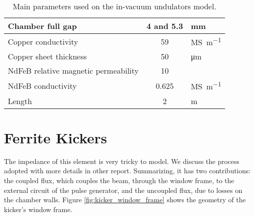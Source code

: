 \begin{table}[!t]
 \centering
 \caption{Main parameters used on the in-vacuum undulators model.}
 \label{tab:invac_undulators}
 \begin{tabular}{lcl}\hline
  Chamber full gap      & 4 and 5.3            & \si{\milli\meter} \\\hline
  Copper conductivity\cite{matwebsite} & 59& \si{\mega\siemens\per\meter} \\\hline
  Copper sheet thickness &     50          & \si{\micro\meter} \\\hline
  NdFeB relative magnetic permeability & 10    & \\\hline
  NdFeB conductivity\cite{matwebsite} & 0.625& \si{\mega\siemens\per\meter}\\\hline
  Length                & 2                & \si{\meter}   \\\hline
 \end{tabular}
\end{table}



\section{Ferrite Kickers}

The impedance of this element is very tricky to model. We discuss the process adopted with more details in other report. Summarizing, it has two contributions: the coupled flux, which couples the beam, through the window frame, to the external circuit of the pulse generator, and the uncoupled flux, due to losses on the chamber walls. Figure \ref{fig:kicker_window_frame} shows the geometry of the kicker's window frame.


